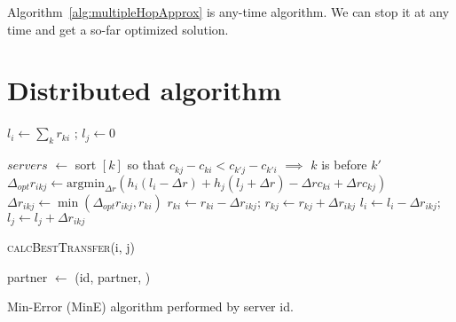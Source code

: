 \documentclass[11pt]{article}
\begin{document}
Algorithm~\ref{alg:multipleHopApprox} is any-time algorithm. We can stop it at any time and get a so-far optimized solution.














\section{Distributed algorithm}\label{sec:distr-algor}

\begin{algorithm}[t!]
  $l_{i} \leftarrow \sum_{k} r_{ki}$ ; $l_{j} \leftarrow 0$ \;

  $servers$ $\leftarrow$ sort $[k]$ so that $c_{kj} - c_{ki} < c_{k'j} - c_{k'i}$ $\implies$ $k$ is before $k'$\;
  {
      $\Delta_{\mathit{opt}} r_{ikj} \leftarrow \mathrm{argmin}_{\Delta r}\left( h_i(l_i - \Delta r) +  h_j(l_{j} + \Delta r) - \Delta r c_{ki} + \Delta r c_{kj}\right) $ \;
      $\Delta r_{ikj} \leftarrow \min\left(\Delta_{\mathit{opt}} r_{ikj}, r_{ki}\right)$ \;
      {
         $r_{ki} \leftarrow r_{ki} - \Delta r_{ikj}$; $r_{kj} \leftarrow r_{kj} + \Delta r_{ikj}$ \;
         $l_{i} \leftarrow l_{i} - \Delta r_{ikj}$; $l_{j} \leftarrow l_{j} + \Delta r_{ikj}$ \;
      }
  }
  \caption{\textsc{calcBestTransfer}(i, j)}
  \label{alg:exchangingLoads}
\end{algorithm}

\begin{algorithm}[h]
  partner $\leftarrow$ \;
  \transfer(id, partner, )\;
  \caption{Min-Error (MinE) algorithm performed by server id.}
  \label{alg:distributedOptimal}
\end{algorithm}
\end{document}
